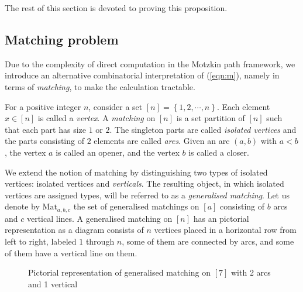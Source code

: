 \documentclass{amsart}
\newcommand{\set}[1]{\left\{#1\right\}}
\theoremstyle{plain}
\theoremstyle{remark}
\numberwithin{equation}{section}
\begin{document}
The rest of this section is devoted to proving this proposition. 

\subsection{Matching problem} Due to the complexity of direct computation in the Motzkin path framework, we introduce an alternative combinatorial interpretation of (\ref{eqn:m}), namely in terms of \textit{matching}, to make the calculation tractable.

For a positive integer $n$, consider a set $[n]=\set{1,2,\cdots,n}$. Each element $x\in [n]$ is called a \textit{vertex}. A \textit{matching} on $[n]$ is a set partition of $[n]$ such that each part has size $1$ or $2$. The singleton parts are called \textit{isolated vertices} and the parts consisting of $2$ elements are called \textit{arcs}. Given an arc $(a,b)$ with $a<b$, the vertex $a$ is called an opener, and the vertex $b$ is called a closer.

We extend the notion of matching by distinguishing two types of isolated vertices: isolated vertices and \textit{verticals}. The resulting object, in which isolated vertices are assigned types, will be referred to as a \textit{generalised matching}. Let us denote by ${\mathrm{Mat}}_{a,b,c}$ the set of generalised matchings on $[a]$ consisting of $b$ arcs and $c$ vertical lines. A generalised matching on $[n]$ has an pictorial representation as a diagram consists of $n$ vertices placed in a horizontal row from left to right, labeled $1$ through $n$, some of them are connected by arcs, and some of them have a vertical line on them.

\begin{figure}[h]
\centering
{}
\caption{Pictorial representation of generalised matching on $[7]$ with 2 arcs and 1 vertical}
\end{figure}
\end{document}
